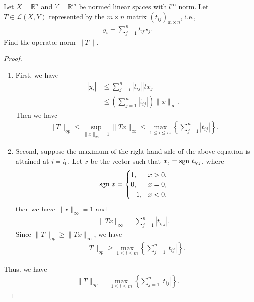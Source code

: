 \documentclass[12pt]{article}
\begin{document}
\medskip

Let $X = \mathbb{R}^n$ and $Y = \mathbb{R}^m$ be normed linear spaces with $l^\infty$ norm. Let $T \in \mathcal{L}(X,Y)$ represented by the $m\times n$ matrix $\left(t_{ij}\right)_{m\times n}$, i.e.,
\begin{align*}
    y_i = \sum^n_{j=1} t_{ij} x_j.
\end{align*}
Find the operator norm $\|T\|$.
\begin{proof}
~\begin{enumerate}[label=(\arabic*)]
    \item First, we have 
    \begin{align*}
        \left|y_i\right| & \leq \sum^n_{j=1} \left|t_{ij}\right| \left|tx_j\right| \\
        & \leq \left(\sum^n_{j=1} \left|t_{ij}\right| \right) \|x\|_\infty.
    \end{align*}
    Then we have
    \begin{align*}
        \|T\|_{op} \leq \sup_{\|x\|_\infty = 1} \|Tx\|_\infty \leq \max_{1\leq i\leq m} \left\{\sum^n_{j=1} \left|t_{ij}\right| \right\}.
    \end{align*}
    
    \item Second, suppose the maximum of the right hand side of the above equation is attained at $i = i_0$. Let $x$ be the vector such that $x_j = {\rm sgn}\,\, t_{i_0 j}$, where 
    \begin{align*}
        {\rm sgn}\,\, x = \begin{cases}
            1, & x > 0, \\
            0, & x = 0, \\
            -1, & x < 0.
        \end{cases}
    \end{align*}
    then we have $\|x\|_\infty = 1$ and 
    \begin{align*}
        \|Tx\|_\infty = \sum^n_{j=1} \left|t_{i_0 j}\right|.
    \end{align*}
    Since $\|T\|_{op} \geq \|Tx\|_\infty$, we have 
    \begin{align*}
        \|T\|_{op} \geq \max_{1\leq i\leq m} \left\{\sum^n_{j=1} \left|t_{ij}\right| \right\}.
    \end{align*}
\end{enumerate}
Thus, we have 
\begin{align*}
    \|T\|_{op} = \max_{1\leq i\leq m} \left\{\sum^n_{j=1} \left|t_{ij}\right| \right\}.
\end{align*}

\end{proof}
\end{document}
